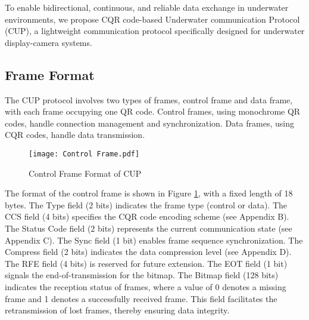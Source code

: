 \documentclass[preprint,12pt]{elsarticle}
\begin{document}
To enable bidirectional, continuous, and reliable data exchange in underwater environments, we propose CQR code-based Underwater communication Protocol (CUP), a lightweight communication protocol specifically designed for underwater display-camera systems.

\subsection{Frame Format}
The CUP protocol involves two types of frames, control frame and data frame, with each frame occupying one QR code. Control frames, using monochrome QR codes, handle connection management and synchronization. Data frames, using CQR codes, handle data transmission.


\begin{figure}[H]
\centering
    \texttt{[image: Control Frame.pdf]}
    \caption{Control Frame Format of CUP}
    \label{fig:control-frame}
\end{figure}

The format of the control frame is shown in Figure \ref{fig:control-frame}, with a fixed length of 18 bytes. The Type field (2 bits) indicates the frame type (control or data). The CCS field (4 bits) specifies the CQR code encoding scheme (see Appendix B). The Status Code field (2 bits) represents the current communication state (see Appendix C). The Sync field (1 bit) enables frame sequence synchronization. The Compress field (2 bits) indicates the data compression level (see Appendix D). The RFE field (4 bits) is reserved for future extension. The EOT field (1 bit) signals the end-of-transmission for the bitmap. The Bitmap field (128 bits) indicates the reception status of frames, where a value of 0 denotes a missing frame and 1 denotes a successfully received frame. This field facilitates the retransmission of lost frames, thereby ensuring data integrity.
\end{document}
